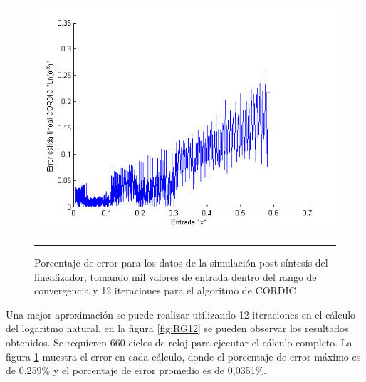 \begin{figure}[H]
  \centering
    \includegraphics[scale=0.8]{./RANGO_12iter_ERROR.png}
    \rule{35em}{0.5pt}
  \caption[Porcentaje de error para los datos de la simulación post-síntesis del linealizador, tomando mil valores de entrada dentro del rango de convergencia y  12 iteraciones para el algoritmo de CORDIC]{Porcentaje de error para los datos de la simulación post-síntesis del linealizador, tomando mil valores de entrada dentro del rango de convergencia y  12 iteraciones para el algoritmo de CORDIC}
  \label{fig:RGE12}
\end{figure}

Una mejor aproximación se puede realizar utilizando 12 iteraciones en el cálculo del logaritmo natural, en la figura \ref{fig:RG12} se pueden observar los resultados obtenidos. Se requieren 660 ciclos de reloj para ejecutar el cálculo completo. La figura \ref{fig:RGE12} muestra el error en cada cálculo, donde el porcentaje de error máximo es de  0,259\% y el porcentaje de error promedio es de 0,0351\%. 

